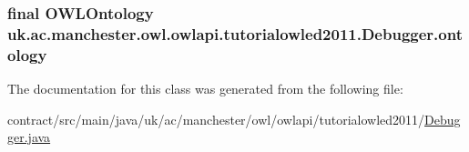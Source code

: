 \hypertarget{classuk_1_1ac_1_1manchester_1_1owl_1_1owlapi_1_1tutorialowled2011_1_1_debugger_a7539a89ed305bb3dde091f3bd816da63}{
\subsubsection[{ontology}]{\setlength{\rightskip}{0pt plus 5cm}final {\bf O\-W\-L\-Ontology} uk.\-ac.\-manchester.\-owl.\-owlapi.\-tutorialowled2011.\-Debugger.\-ontology\hspace{0.3cm}{\ttfamily [private]}}}\label{classuk_1_1ac_1_1manchester_1_1owl_1_1owlapi_1_1tutorialowled2011_1_1_debugger_a7539a89ed305bb3dde091f3bd816da63}


The documentation for this class was generated from the following file\-:\begin{DoxyCompactItemize}
\item 
contract/src/main/java/uk/ac/manchester/owl/owlapi/tutorialowled2011/\hyperlink{main_2java_2uk_2ac_2manchester_2owl_2owlapi_2tutorialowled2011_2_debugger_8java}{Debugger.\-java}\end{DoxyCompactItemize}
